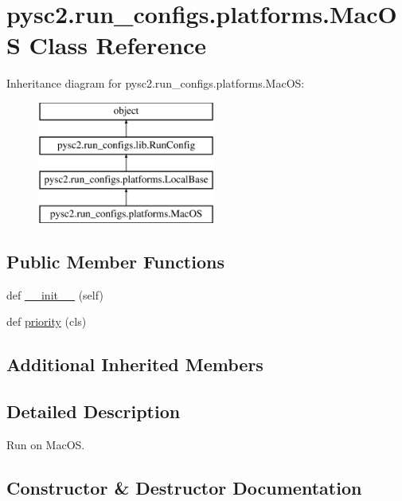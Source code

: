 \hypertarget{classpysc2_1_1run__configs_1_1platforms_1_1_mac_o_s}{}\section{pysc2.\+run\+\_\+configs.\+platforms.\+Mac\+OS Class Reference}
\label{classpysc2_1_1run__configs_1_1platforms_1_1_mac_o_s}
Inheritance diagram for pysc2.\+run\+\_\+configs.\+platforms.\+Mac\+OS\+:\begin{figure}[H]
\begin{center}
\leavevmode
\includegraphics[height=4.000000cm]{classpysc2_1_1run__configs_1_1platforms_1_1_mac_o_s}
\end{center}
\end{figure}
\subsection*{Public Member Functions}
\begin{DoxyCompactItemize}
\item 
def \mbox{\hyperlink{classpysc2_1_1run__configs_1_1platforms_1_1_mac_o_s_a779d93be4eb41669336b0e10b438b372}{\+\_\+\+\_\+init\+\_\+\+\_\+}} (self)
\item 
def \mbox{\hyperlink{classpysc2_1_1run__configs_1_1platforms_1_1_mac_o_s_a217e84d138a4a2c3e471f37177564c23}{priority}} (cls)
\end{DoxyCompactItemize}
\subsection*{Additional Inherited Members}


\subsection{Detailed Description}
\begin{DoxyVerb}Run on MacOS.\end{DoxyVerb}
 

\subsection{Constructor \& Destructor Documentation}
\mbox{\label{classpysc2_1_1run__configs_1_1platforms_1_1_mac_o_s_a779d93be4eb41669336b0e10b438b372}} 
